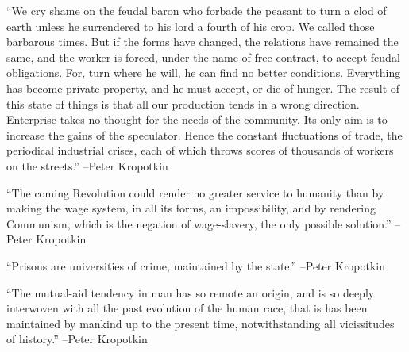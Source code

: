 \documentclass{article}%
\begin{document}
\begin{minipage}{\textwidth}%
\flushleft%
“We cry shame on the feudal baron who forbade the peasant to turn a clod of earth unless he surrendered to his lord a fourth of his crop. We called those barbarous times. But if the forms have changed, the relations have remained the same, and the worker is forced, under the name of free contract, to accept feudal obligations. For, turn where he will, he can find no better conditions. Everything has become private property, and he must accept, or die of hunger. The result of this state of things is that all our production tends in a wrong direction. Enterprise takes no thought for the needs of the community. Its only aim is to increase the gains of the speculator. Hence the constant fluctuations of trade, the periodical industrial crises, each of which throws scores of thousands of workers on the streets.”%
\linebreak%
\vspace{1mm}%
–Peter Kropotkin%
\linebreak%
\vspace{1mm}%
\end{minipage}%
\linebreak%
\vspace{1mm}%
\begin{minipage}{\textwidth}%
\flushleft%
“The coming Revolution could render no greater service to humanity than by making the wage system, in all its forms, an impossibility, and by rendering Communism, which is the negation of wage{-}slavery, the only possible solution.”%
\linebreak%
\vspace{1mm}%
–Peter Kropotkin%
\linebreak%
\vspace{1mm}%
\end{minipage}%
\linebreak%
\vspace{1mm}%
\begin{minipage}{\textwidth}%
\flushleft%
“Prisons are universities of crime, maintained by the state.”%
\linebreak%
\vspace{1mm}%
–Peter Kropotkin%
\linebreak%
\vspace{1mm}%
\end{minipage}%
\linebreak%
\vspace{1mm}%
\begin{minipage}{\textwidth}%
\flushleft%
“The mutual{-}aid tendency in man has so remote an origin, and is so deeply interwoven with all the past evolution of the human race, that is has been maintained by mankind up to the present time, notwithstanding all vicissitudes of history.”%
\linebreak%
\vspace{1mm}%
–Peter Kropotkin%
\linebreak%
\vspace{1mm}%
\end{minipage}%
\end{document}
